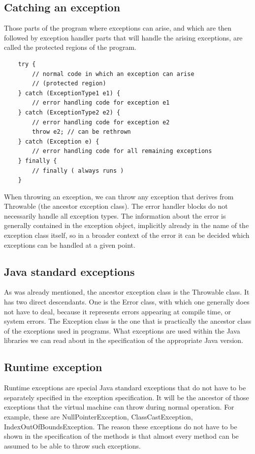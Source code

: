 \documentclass[margin=0px]{article}
\begin{document}
\subsection{Catching an exception}
Those parts of the program where exceptions can arise, and which are then followed by exception handler parts that will handle the arising exceptions, are called the protected regions of the program.

\begin{verbatim}
    try {
        // normal code in which an exception can arise
        // (protected region)
    } catch (ExceptionType1 e1) {
        // error handling code for exception e1
    } catch (ExceptionType2 e2) {
        // error handling code for exception e2
        throw e2; // can be rethrown
    } catch (Exception e) {
        // error handling code for all remaining exceptions
    } finally {
        // finally ( always runs )
    }
\end{verbatim}

When throwing an exception, we can throw any exception that derives from Throwable (the ancestor exception class). The error handler blocks do not necessarily handle all exception types. The information about the error is generally contained in the exception object, implicitly already in the name of the exception class itself, so in a broader context of the error it can be decided which exceptions can be handled at a given point.

\subsection{Java standard exceptions}

As was already mentioned, the ancestor exception class is the Throwable class. It has two direct descendants. One is the Error class, with which one generally does not have to deal, because it represents errors appearing at compile time, or system errors. The Exception class is the one that is practically the ancestor class of the exceptions used in programs. What exceptions are used within the Java libraries we can read about in the specification of the appropriate Java version.

\subsection{Runtime exception}

Runtime exceptions are special Java standard exceptions that do not have to be separately specified in the exception specification. It will be the ancestor of those exceptions that the virtual machine can throw during normal operation. For example, these are NullPointerException, ClassCastException, IndexOutOfBoundsException. The reason these exceptions do not have to be shown in the specification of the methods is that almost every method can be assumed to be able to throw such exceptions.
\end{document}
